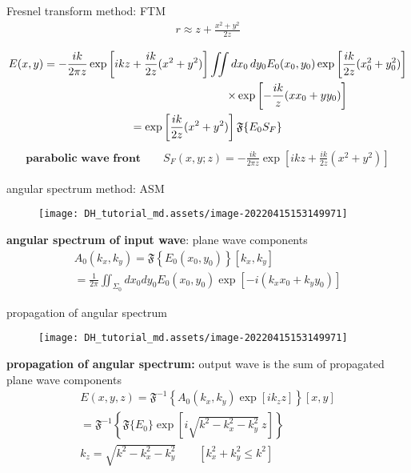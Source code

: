 \documentclass[t, aspectratio=169]{beamer}
\begin{document}
\begin{frame}{Fresnel transform method: FTM}	
	\vspace{-5 mm}
	\begin{gather*}	
r \approx z + \frac{x^2+y^2}{2z} \\
	\end{gather*}
	\pause
	\vspace{-8 mm}
	\begin{gather*}
E(x,y) = - \frac{ik}{2\pi z} \exp\left[ikz + \frac{ik}{2z} (x^2+y^2)\right] \iint dx_0\,dy_0E_0(x_0,y_0)\exp\left[\frac{ik}{2z}(x_0^2+y_0^2)\right] \\
\hspace{50mm}\times\exp\left[-\frac{ik}{z}(xx_0+yy_0)\right] \\ 
=\exp\left[\frac{ik}{2z}(x^2+y^2)\right]\mathfrak F\{E_0S_F\} \\
	\end{gather*}
	\pause
	\vspace{-8 mm}
	\begin{gather*}
\textbf{parabolic wave front} \qquad S_F(x,y;z) = -\frac{ik}{2\pi z}\exp\left[ikz + \frac{ik}{2z}(x^2+y^2)\right]
	\end{gather*}
\end{frame}


\begin{frame}{angular spectrum method: ASM}
	\begin{figure}
		\texttt{[image: DH\_tutorial\_md.assets/image-20220415153149971]}
	\end{figure}
	\textbf{angular spectrum of input wave}: plane wave components
	\begin{gather*}
A_0(k_x,k_y) = \mathfrak F\left\{E_0(x_0,y_0)\right\}\left[k_x,k_y\right] \\
=\frac{1}{2\pi}\iint_{\Sigma_0} dx_0 dy_0 E_0(x_0,y_0) \exp\left[-i(k_x x_0 + k_y y_0)\right]
	\end{gather*}
\end{frame}


\begin{frame}{propagation of angular spectrum}
	\begin{figure}
		\texttt{[image: DH\_tutorial\_md.assets/image-20220415153149971]}
	\end{figure}
\textbf{propagation of angular spectrum:} output wave is the sum of propagated plane wave components
	\begin{gather*}
E(x,y,z) = \mathfrak F^{-1}\left\{A_0(k_x,k_y) \exp[ik_z z]\right\}[x,y] \\
= \mathfrak F^{-1}\left\{\mathfrak F\{E_0\}\exp\left[i\sqrt{k^2 - k_x^2 - k_y^2}\ z\right]\right\} \\
k_z = \sqrt{k^2 - k_x^2 - k_y^2} \qquad \left[ k_x^2 + k_y^2 \le k^2 \right]	
	\end{gather*}
\end{frame}
\end{document}
